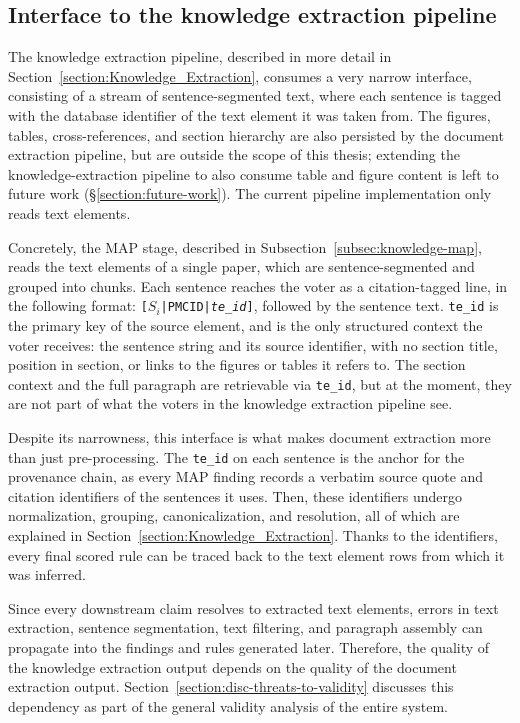 \subsection{Interface to the knowledge extraction pipeline}\label{subsec:doc-interface-to-knowledge-pipeline}

The knowledge extraction pipeline, described in more detail in Section~\ref{section:Knowledge_Extraction}, consumes a very narrow interface, consisting of a stream of sentence-segmented text, where each sentence is tagged with the database identifier of the text element it was taken from. The figures, tables, cross-references, and section hierarchy are also persisted by the document extraction pipeline, but are outside the scope of this thesis; extending the knowledge-extraction pipeline to also consume table and figure content is left to future work (§\ref{section:future-work}). The current pipeline implementation only reads text elements. 

Concretely, the MAP stage, described in Subsection~\ref{subsec:knowledge-map}, reads the text elements of a single paper, which are sentence-segmented and grouped into chunks. Each sentence reaches the voter as a citation-tagged line, in the following format: \texttt{[$S_\textit{i}$|PMCID|\textit{te\_id}]}, followed by the sentence text. \texttt{te\_id} is the primary key of the source element, and is the only structured context the voter receives: the sentence string and its source identifier, with no section title, position in section, or links to the figures or tables it refers to. The section context and the full paragraph are retrievable via \texttt{te\_id}, but at the moment, they are not part of what the voters in the knowledge extraction pipeline see.

Despite its narrowness, this interface is what makes document extraction more than just pre-processing. The \texttt{te\_id} on each sentence is the anchor for the provenance chain, as every MAP finding records a verbatim source quote and citation identifiers of the sentences it uses. Then, these identifiers undergo normalization, grouping, canonicalization, and resolution, all of which are explained in Section~\ref{section:Knowledge_Extraction}. Thanks to the identifiers, every final scored rule can be traced back to the text element rows from which it was inferred. 

Since every downstream claim resolves to extracted text elements, errors in text extraction, sentence segmentation, text filtering, and paragraph assembly can propagate into the findings and rules generated later. Therefore, the quality of the knowledge extraction output depends on the quality of the document extraction output. Section~\ref{section:disc-threats-to-validity} discusses this dependency as part of the general validity analysis of the entire system.